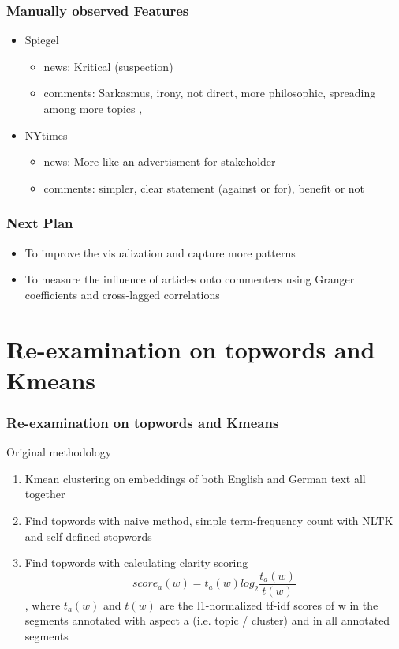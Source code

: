 \documentclass{tum-presentation}
\begin{document}
\begin{frame}
  \frametitle{Manually observed Features}
 
  \begin{itemize}
    \item Spiegel
    \begin{itemize}
      \item news: Kritical (suspection) 
      \item comments:  Sarkasmus, irony, not direct, more philosophic, spreading among more topics ,
    \end{itemize}
    \item NYtimes
    \begin{itemize}
      \item news: More like an advertisment for stakeholder 
    \item comments: simpler, clear statement (against or for), benefit or not
      \end{itemize}
  \end{itemize}

\end{frame}


\begin{frame}
  \frametitle{Next Plan}
  \begin{itemize}
    \item To improve the visualization and capture more patterns
    \item To measure the influence of articles onto commenters using Granger coefficients and cross-lagged correlations
\end{itemize}
\end{frame}


\section{Re-examination on topwords and Kmeans}
\begin{frame}
  \frametitle{Re-examination on topwords and Kmeans}
    Original methodology
    \begin{enumerate}
      \item Kmean clustering on embeddings of both English and German text all together
      \item Find topwords with naive method, simple term-frequency count with NLTK and self-defined stopwords
      \item Find topwords with calculating clarity scoring \[score_a(w) = t_a(w) log_2\frac{t_a(w)}{t(w)}\], where $t_a(w)$ and $t(w)$ are the l1-normalized tf-idf scores of w in the segments annotated with aspect a (i.e. topic / cluster) and in all annotated segments
    \end{enumerate}
\end{frame}
\end{document}
